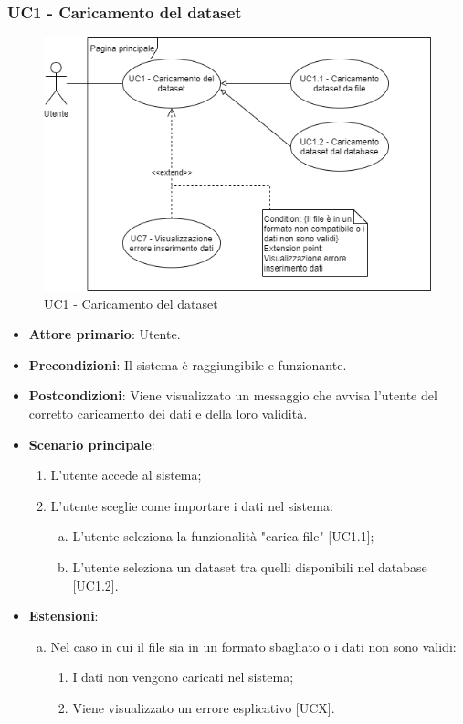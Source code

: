 \subsubsection{UC1 - Caricamento del dataset}
\begin{figure}[h]
\includegraphics[width=\linewidth]{section/Images/UC1.png}
\centering
\caption{UC1 - Caricamento del dataset}
\end{figure}
\begin{itemize}
	\item \textbf{Attore primario}: Utente.
	\item \textbf{Precondizioni}: Il sistema è raggiungibile e funzionante.
	\item \textbf{Postcondizioni}: Viene visualizzato un messaggio che avvisa l'utente del corretto caricamento dei dati e della loro validità.
	\item \textbf{Scenario principale}:
		\begin{enumerate}
			\item L'utente accede al sistema;
			\item L'utente sceglie come importare i dati nel sistema:
				\begin{enumerate}[(a)]
			\item L'utente seleziona la funzionalità "carica file" [UC1.1];
			\item L'utente seleziona un dataset tra quelli disponibili nel database [UC1.2].
				\end{enumerate}
		\end{enumerate}
	\item \textbf{Estensioni}:
	\begin{enumerate}[(a)]
		\item Nel caso in cui il file sia in un formato sbagliato o i dati non sono validi:
		\begin{enumerate}[1.]
			\item I dati non vengono caricati nel sistema;
			\item Viene visualizzato un errore esplicativo [UCX].
		\end{enumerate}
	\end{enumerate}
\end{itemize}






  